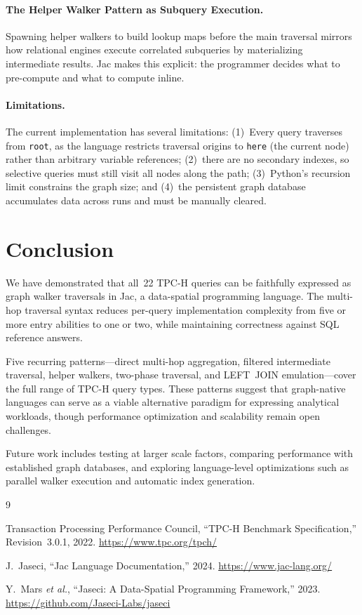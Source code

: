 \documentclass[11pt]{article}
\begin{document}
\paragraph{The Helper Walker Pattern as Subquery Execution.}
Spawning helper walkers to build lookup maps before the main traversal
mirrors how relational engines execute correlated subqueries by
materializing intermediate results.
Jac makes this explicit: the programmer decides what to pre-compute
and what to compute inline.

\paragraph{Limitations.}
The current implementation has several limitations:
(1)~Every query traverses from \texttt{root}, as the language restricts
traversal origins to \lstinline|here| (the current node) rather than
arbitrary variable references;
(2)~there are no secondary indexes, so selective queries must still visit
all nodes along the path;
(3)~Python's recursion limit constrains the graph size; and
(4)~the persistent graph database accumulates data across runs and must
be manually cleared.

\section{Conclusion}

We have demonstrated that all~22 TPC-H queries can be faithfully
expressed as graph walker traversals in Jac, a data-spatial programming
language.
The multi-hop traversal syntax reduces per-query implementation
complexity from five or more entry abilities to one or two, while
maintaining correctness against SQL reference answers.

Five recurring patterns---direct multi-hop aggregation, filtered
intermediate traversal, helper walkers, two-phase traversal, and
LEFT~JOIN emulation---cover the full range of TPC-H query types.
These patterns suggest that graph-native languages can serve as a
viable alternative paradigm for expressing analytical workloads,
though performance optimization and scalability remain open challenges.

Future work includes testing at larger scale factors, comparing
performance with established graph databases, and exploring language-level
optimizations such as parallel walker execution and automatic index
generation.

\begin{thebibliography}{9}

Transaction Processing Performance Council,
``TPC-H Benchmark Specification,''
Revision~3.0.1, 2022.
\url{https://www.tpc.org/tpch/}

J.~Jaseci,
``Jac Language Documentation,''
2024.
\url{https://www.jac-lang.org/}

Y.~Mars \emph{et al.},
``Jaseci: A Data-Spatial Programming Framework,''
2023.
\url{https://github.com/Jaseci-Labs/jaseci}

\end{thebibliography}
\end{document}
